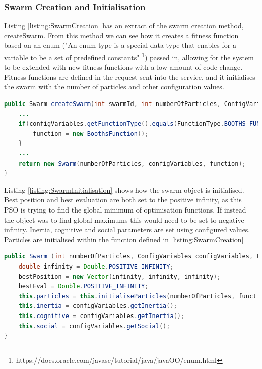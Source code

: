 \documentclass[oneside,12pt]{book}
\begin{document}
\subsubsection{Swarm Creation and Initialisation}
Listing \ref{listing:SwarmCreation} has an extract of the swarm creation method, createSwarm. From this method we can see how it creates a fitness function based on an enum ("An enum type is a special data type that enables for a variable to be a set of predefined constants" \footnote{https://docs.oracle.com/javase/tutorial/java/javaOO/enum.html}) passed in, allowing for the system to be extended with new fitness functions with a low amount of code change. Fitness functions are defined in the request sent into the service, and it initialises the swarm with the number of particles and other configuration values.

\begin{lstlisting}[basicstyle=\footnotesize, language=Java]
public Swarm createSwarm(int swarmId, int numberOfParticles, ConfigVariables configVariables) throws Exception {
    ...
    if(configVariables.getFunctionType().equals(FunctionType.BOOTHS_FUNCTION)){
        function = new BoothsFunction();
    } 
    ...
    return new Swarm(numberOfParticles, configVariables, function);
}
\end{lstlisting}
\label{listing:SwarmCreation}

Listing \ref{listing:SwarmInitialisation} shows how the swarm object is initialised. Best position and best evaluation are both set to the positive infinity, as this PSO is trying to find the global minimum of optimisation functions. If instead the object was to find global maximums this would need to be set to negative infinity. Inertia, cognitive and social parameters are set using configured values. Particles are initialised within the function defined in \ref{listing:SwarmCreation}

\begin{lstlisting}[basicstyle=\footnotesize, language=Java]
public Swarm (int numberOfParticles, ConfigVariables configVariables, Function function) {
    double infinity = Double.POSITIVE_INFINITY;
    bestPosition = new Vector(infinity, infinity, infinity);
    bestEval = Double.POSITIVE_INFINITY;
    this.particles = this.initialiseParticles(numberOfParticles, function);
    this.inertia = configVariables.getInertia();
    this.cognitive = configVariables.getInertia();
    this.social = configVariables.getSocial();
}
\end{lstlisting}
\label{listing:SwarmInitialisation}
\end{document}
